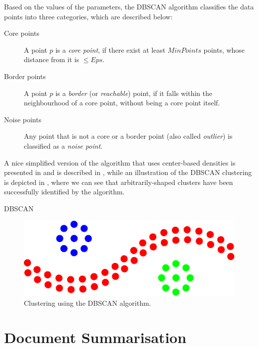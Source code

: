 Based on the values of the parameters, the DBSCAN algorithm classifies the data points into three categories, which are described below:

\begin{description}
\item[Core points] A point $p$ is a \textit{core point}, if there exist at least $MinPoints$ points, whose distance from it is $\leq Eps$.
\item[Border points] A point $p$ is a \textit{border} (or \textit{reachable}) point, if it falls within the neighbourhood of a core point, without being a core point itself.
\item[Noise points] Any point that is not a core or a border point (also called \textit{outlier}) is classified as a \textit{noise point}.
\end{description}

A nice simplified version of the algorithm that uses center-based densities is presented in \cite{Pang:2006} and is described in , while an illustration of the DBSCAN clustering is depicted in , where we can see that arbitrarily-shaped clusters have been successfully identified by the algorithm. 


\begin{algorithm}[ht]
\caption[DBSCAN]{DBSCAN}
\label{algorithms:dbscan}

\end{algorithm}


\begin{figure}[ht]
  \centering
  \includegraphics[scale=0.5]{images/dbscan.pdf}
  \caption[Clustering using the DBSCAN algorithm]{Clustering using the DBSCAN algorithm.}
  \label{images:dbscan}
\end{figure}


\section{Document Summarisation}
\label{sec:document-summarisation}

